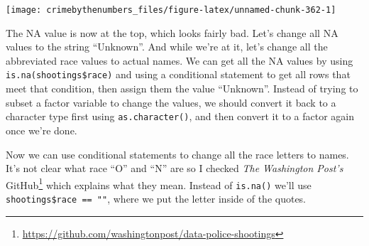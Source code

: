 \documentclass[
  a4paper,
]{krantz}
\makeatletter
\newenvironment{Shaded}{\begin{snugshade}}{\end{snugshade}}
\newcommand{\FunctionTok}[1]{\textcolor[rgb]{0.00,0.00,0.00}{#1}}
\newcommand{\NormalTok}[1]{#1}
\newcommand{\OtherTok}[1]{\textcolor[rgb]{0.56,0.35,0.01}{#1}}
\newcommand{\SpecialCharTok}[1]{\textcolor[rgb]{0.00,0.00,0.00}{#1}}
\newcommand{\StringTok}[1]{\textcolor[rgb]{0.31,0.60,0.02}{#1}}
\renewcommand{\href}[2]{#2\footnote{\url{#1}}}
\newenvironment{kframe}{%
\medskip{}
\setlength{\fboxsep}{.8em}
 \def\at@end@of@kframe{}%
 \ifinner\ifhmode%
  \def\at@end@of@kframe{\end{minipage}}%
  \begin{minipage}{\columnwidth}%
 \fi\fi%
 \def\FrameCommand##1{\hskip\@totalleftmargin \hskip-\fboxsep
 \colorbox{shadecolor}{##1}\hskip-\fboxsep
     \hskip-\linewidth \hskip-\@totalleftmargin \hskip\columnwidth}%
 \MakeFramed {\advance\hsize-\width
   \@totalleftmargin\z@ \linewidth\hsize
   \@setminipage}}%
 {\par\unskip\endMakeFramed%
 \at@end@of@kframe}
\renewenvironment{Shaded}{\begin{kframe}}{\end{kframe}}
\makeatother
\begin{document}
\begin{center}\texttt{[image: crimebythenumbers\_files/figure-latex/unnamed-chunk-362-1]} \end{center}

The NA value is now at the top, which looks fairly bad.
Let's change all NA values to the string ``Unknown''. And
while we're at it, let's change all the abbreviated race
values to actual names. We can get all the NA values by
using \texttt{is.na(shootings\$race)} and using a
conditional statement to get all rows that meet that
condition, then assign them the value ``Unknown''. Instead
of trying to subset a factor variable to change the values,
we should convert it back to a character type first using
\texttt{as.character()}, and then convert it to a factor
again once we're done.

\begin{Shaded}
\end{Shaded}

Now we can use conditional statements to change all the race
letters to names. It's not clear what race ``O'' and ``N''
are so I checked
\href{https://github.com/washingtonpost/data-police-shootings}{\emph{The
Washington Post's} GitHub} which explains what they mean.
Instead of \texttt{is.na()} we'll use
\texttt{shootings\$race\ ==\ ""}, where we put the letter
inside of the quotes.

\begin{Shaded}
\end{Shaded}
\end{document}
